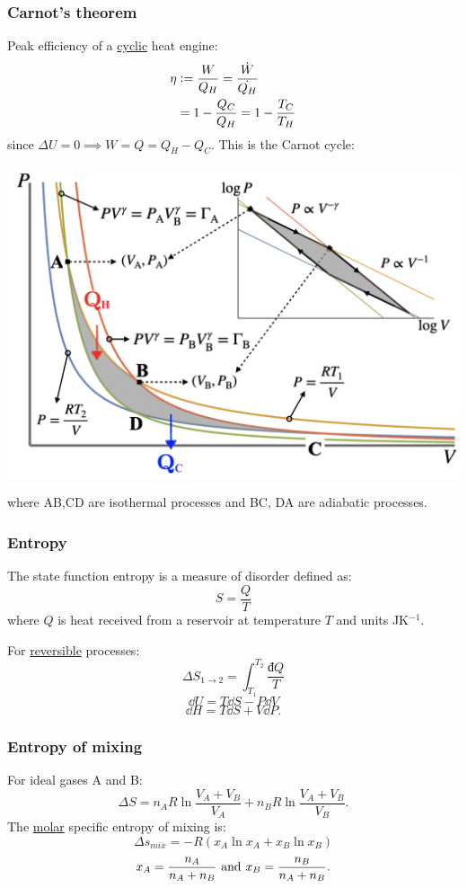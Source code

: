 \documentclass{article}
\newcommand{\deq}{\vcentcolon=}
\newcommand{\idd}{\text{đ}}
\begin{document}
\begin{multicols*}{3}
\subsubsection*{Carnot's theorem}
Peak efficiency of a \underline{cyclic}
heat engine:
\begin{align*}
    \eta&\deq\frac{W}{Q_H}
    =\frac{\dot{W}}{\dot{Q_H}} \\
    &=1-\frac{Q_C}{Q_H}=1-\frac{T_C}{T_H}
\end{align*}
since $\Delta U=0
\implies W=Q=Q_H-Q_C$.
This is the Carnot cycle:
\begin{center}
    \includegraphics*[scale=0.13]{f0.png}
\end{center}
where AB,CD are isothermal processes
and BC, DA are adiabatic processes.

\subsubsection*{Entropy}
The state function entropy is a measure
of disorder defined as:
$$S=\frac{Q}{T}$$
where $Q$ is heat received from a reservoir
at temperature $T$
and units JK$^{-1}$.

For \underline{reversible} processes:
$$\Delta S_{1\rightarrow2}
=\int_{T_1}^{T_2}\frac{\idd Q}{T}$$
$$\dd U=T\dd S-P\dd V$$
$$\dd H=T\dd S+V\dd P.$$

\subsubsection*{Entropy of mixing}
For ideal gases A and B:
$$\Delta S=n_A R\ln\frac{V_A+V_B}{V_A}
+n_B R\ln\frac{V_A+V_B}{V_B}.$$
The \underline{molar} specific entropy of mixing is:
$$\Delta s_{mix}=-R(x_A\ln x_A+x_B\ln x_B)$$
$$x_A=\frac{n_A}{n_A+n_B}
\hspace{0.05in}\text{and}\hspace{0.05in}
x_B=\frac{n_B}{n_A+n_B}.$$


\end{multicols*}
\end{document}
